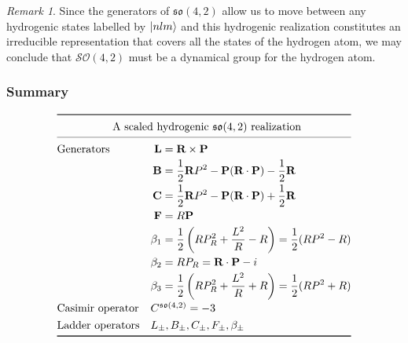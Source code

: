 \documentclass[12pt,a4paper]{report}
\theoremstyle{definition}
\theoremstyle{remark}
\newtheorem*{remark}{Remark}
\theoremstyle{remark}
\begin{document}
\begin{remark}
Since the generators of $\mathfrak{so}(4,2)$ allow us to move between any hydrogenic states labelled by $\ket{nlm}$ and this hydrogenic realization constitutes an irreducible representation that covers all the states of the hydrogen atom, we may conclude that $\mathcal{SO}(4,2)$ must be a dynamical group for the hydrogen atom.
\end{remark}

\subsubsection{Summary}
\begin{equation*}
\def\arraystretch{1.3}
\begin{array}{@{}ll@{}}
\toprule
 \multicolumn{2}{c@{}}{\text{A scaled hydrogenic }\mathfrak{so}(4,2) \text{ realization}} \\
\cmidrule{1-2}
 \text{Generators} & \begin{aligned}[t]
  \textbf{L}&=\textbf{R}\times\textbf{P}\\
\textbf{B}&=\frac{1}{2}\textbf{R}P^2-\textbf{P}(\textbf{R}\cdot\textbf{P})-\frac{1}{2}\textbf{R}\\
\textbf{C}&=\frac{1}{2}\textbf{R}P^2-\textbf{P}(\textbf{R}\cdot\textbf{P})+\frac{1}{2}\textbf{R}\\
\textbf{F}&=R\textbf{P}\\
\beta_1&=\frac{1}{2}\left(RP_R^2+\frac{L^2}{R}-R\right)=\frac{1}{2}(RP^2-R)\\
  \beta_2&=RP_R=\textbf{R}\cdot\textbf{P}-i\\
  \beta_3&=\frac{1}{2}\left(RP_R^2+\frac{L^2}{R}+R\right)=\frac{1}{2}(RP^2+R)
  \end{aligned}\\
 \text{Casimir operator} & C^{\mathfrak{so}(4,2)}=-3\\
\text{Ladder operators} & L_\pm,B_\pm,C_\pm,F_\pm,\beta_\pm\\
\bottomrule
\end{array}
\end{equation*}
\end{document}
